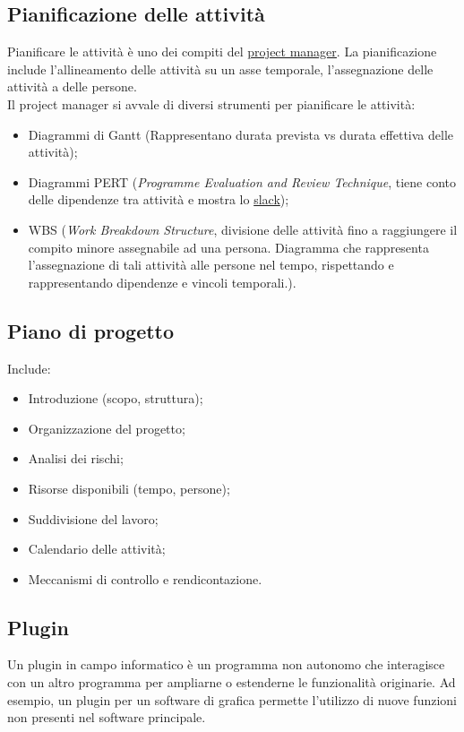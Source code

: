 	\subsection{Pianificazione delle attività}	
	\label{sec:pianificazioneattivita}
	Pianificare le attività è uno dei compiti del \underline{\hyperref[sec:projectmanager]{project manager}}.
	La pianificazione include l'allineamento delle attività su un asse temporale, l'assegnazione delle attività a delle persone. \\Il project manager si avvale di diversi strumenti per pianificare le attività:  	
	\begin{itemize}  
	\item Diagrammi di Gantt (Rappresentano durata prevista vs durata effettiva delle attività);
	\item Diagrammi PERT (\emph{Programme Evaluation and Review Technique}, tiene conto delle dipendenze tra attività e mostra lo \hyperref[sec:slack]{slack});
	\item WBS (\emph{Work Breakdown Structure}, divisione delle attività fino a raggiungere il compito minore assegnabile ad una persona. Diagramma che rappresenta l'assegnazione di tali attività alle persone nel tempo, rispettando e rappresentando dipendenze e vincoli temporali.).
	\end{itemize}	

	
	\subsection{Piano di progetto}	
	\label{sec:pianoprogetto}
	Include:
	\begin{itemize}  
	\item Introduzione (scopo, struttura);
	\item Organizzazione del progetto;
	\item Analisi dei rischi;
	\item Risorse disponibili (tempo, persone);
	\item Suddivisione del lavoro;
	\item Calendario delle attività;
	\item Meccanismi di controllo e rendicontazione.
	\end{itemize}	

	\subsection{Plugin}
	\label{sec:plugin}
	Un plugin in campo informatico è un programma non autonomo che interagisce con un altro programma per ampliarne o estenderne le funzionalità originarie. Ad esempio, un plugin per un software di grafica permette l'utilizzo di nuove funzioni non presenti nel software principale.
		
